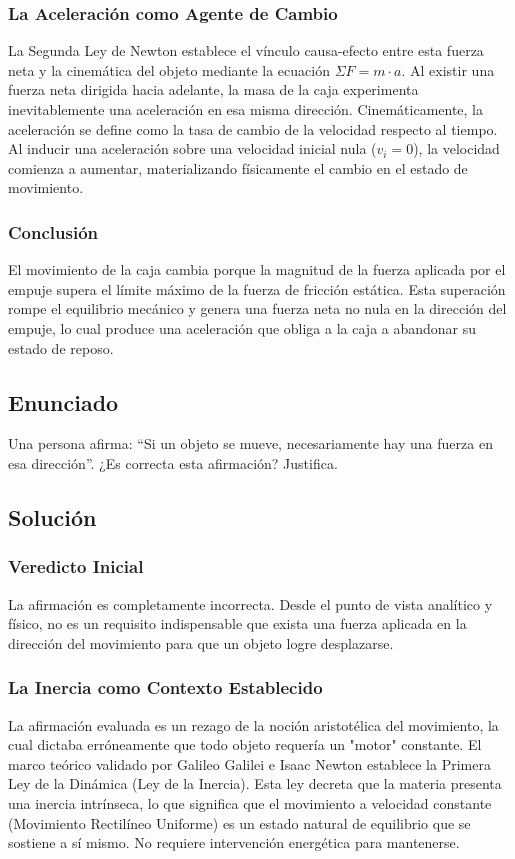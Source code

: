\documentclass[12pt]{article}
\begin{document}
\subsubsection*{La Aceleración como Agente de Cambio}
La Segunda Ley de Newton establece el vínculo causa-efecto entre esta fuerza neta y la cinemática del objeto mediante la ecuación $\Sigma F = m \cdot a$. Al existir una fuerza neta dirigida hacia adelante, la masa de la caja experimenta inevitablemente una aceleración en esa misma dirección. Cinemáticamente, la aceleración se define como la tasa de cambio de la velocidad respecto al tiempo. Al inducir una aceleración sobre una velocidad inicial nula ($v_i = 0$), la velocidad comienza a aumentar, materializando físicamente el cambio en el estado de movimiento.

\subsubsection*{Conclusión}
El movimiento de la caja cambia porque la magnitud de la fuerza aplicada por el empuje supera el límite máximo de la fuerza de fricción estática. Esta superación rompe el equilibrio mecánico y genera una fuerza neta no nula en la dirección del empuje, lo cual produce una aceleración que obliga a la caja a abandonar su estado de reposo.

\newpage

\subsection*{Enunciado}
Una persona afirma: ``Si un objeto se mueve, necesariamente hay una fuerza en esa dirección''. ¿Es correcta esta afirmación? Justifica.

\subsection*{Solución}

\subsubsection*{Veredicto Inicial}
La afirmación es completamente incorrecta. Desde el punto de vista analítico y físico, no es un requisito indispensable que exista una fuerza aplicada en la dirección del movimiento para que un objeto logre desplazarse.

\subsubsection*{La Inercia como Contexto Establecido}
La afirmación evaluada es un rezago de la noción aristotélica del movimiento, la cual dictaba erróneamente que todo objeto requería un "motor" constante. El marco teórico validado por Galileo Galilei e Isaac Newton establece la Primera Ley de la Dinámica (Ley de la Inercia). Esta ley decreta que la materia presenta una inercia intrínseca, lo que significa que el movimiento a velocidad constante (Movimiento Rectilíneo Uniforme) es un estado natural de equilibrio que se sostiene a sí mismo. No requiere intervención energética para mantenerse.
\end{document}
